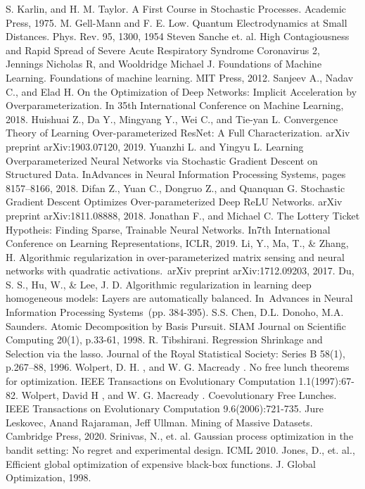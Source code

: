 \clearpage
\newpage
{} %
\begin{thebibliography}{1}
  S. Karlin, and H. M. Taylor. A First Course in Stochastic Processes. Academic Press, 1975.
  M. Gell-Mann and F. E. Low. Quantum Electrodynamics at Small Distances. Phys. Rev. 95, 1300, 1954
  Steven Sanche et. al. High Contagiousness and Rapid Spread of Severe Acute Respiratory Syndrome Coronavirus 2, 
  Jennings Nicholas R, and Wooldridge Michael J. Foundations of Machine Learning. Foundations of machine learning. MIT Press, 2012.
  Sanjeev A., Nadav C., and    Elad H. On the Optimization of Deep Networks: Implicit Acceleration by Overparameterization. In 35th International Conference on Machine Learning, 2018.
  Huishuai Z., Da Y., Mingyang Y., Wei C., and Tie-yan L. Convergence Theory of Learning Over-parameterized ResNet: A Full Characterization. arXiv preprint arXiv:1903.07120, 2019.
  Yuanzhi L. and Yingyu L. Learning Overparameterized Neural Networks via Stochastic Gradient Descent on Structured Data. InAdvances in Neural Information Processing Systems, pages 8157–8166, 2018.
  Difan Z., Yuan C., Dongruo Z., and Quanquan G. Stochastic Gradient Descent Optimizes Over-parameterized Deep ReLU Networks. arXiv preprint arXiv:1811.08888, 2018.
  Jonathan F., and Michael C. The Lottery Ticket Hypotheis: Finding Sparse, Trainable Neural Networks. In7th International Conference on Learning Representations, ICLR, 2019.
  Li, Y., Ma, T., \& Zhang, H. Algorithmic regularization in over-parameterized matrix sensing and neural networks with quadratic activations. arXiv preprint arXiv:1712.09203, 2017.
  Du, S. S., Hu, W., \& Lee, J. D. Algorithmic regularization in learning deep homogeneous models: Layers are automatically balanced. In Advances in Neural Information Processing Systems (pp. 384-395).
  S.S. Chen, D.L. Donoho, M.A. Saunders. Atomic Decomposition by Basis Pursuit. SIAM Journal on Scientific Computing 20(1), p.33-61, 1998.
  R. Tibshirani. Regression Shrinkage and Selection via the lasso. Journal of the Royal Statistical Society: Series B 58(1), p.267–88, 1996.
  Wolpert, D. H. , and W. G. Macready . No free lunch theorems for optimization. IEEE Transactions on Evolutionary Computation 1.1(1997):67-82.
  Wolpert, David H , and W. G. Macready . Coevolutionary Free Lunches. IEEE Transactions on Evolutionary Computation 9.6(2006):721-735.
  Jure Leskovec, Anand Rajaraman, Jeff Ullman. Mining of Massive Datasets. Cambridge Press, 2020.
  Srinivas, N., et. al. Gaussian process optimization in the bandit setting: No regret and experimental design. ICML 2010.
  Jones, D., et. al., Efficient global optimization of expensive black-box functions. J. Global Optimization, 1998.
\end{thebibliography}